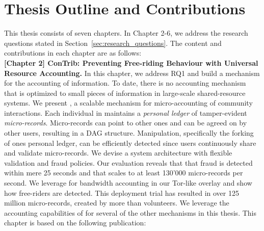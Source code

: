 \section{Thesis Outline and Contributions}
This thesis consists of seven chapters.
In Chapter 2-6, we address the research questions stated in Section~\ref{sec:research_questions}.
The content and contributions in each chapter are as follows:\\

\textbf{[Chapter 2] ConTrib: Preventing Free-riding Behaviour with Universal Resource Accounting.}
In this chapter, we address RQ1 and build a mechanism for the accounting of information.
To date, there is no accounting mechanism that is optimized to small pieces of information in large-scale shared-resource systems.
We present \ModelName{}, a scalable mechanism for micro-accounting of community interactions.
Each individual in \ModelName{} maintains a \emph{personal ledger} of tamper-evident \emph{micro-records}.
Micro-records can point to other ones and can be agreed on by other users, resulting in a DAG structure.
Manipulation, specifically the forking of ones personal ledger, can be efficiently detected since users continuously share and validate micro-records.
We devise a system architecture with flexible validation and fraud policies.
Our evaluation reveals that that fraud is detected within mere 25 seconds and that \ModelName{} scales to at least 130'000 micro-records per second.
We leverage \ModelName{} for bandwidth accounting in our Tor-like overlay and show how free-riders are detected.
This deployment trial has resulted in over 125 million micro-records, created by more than \TrialUsers{} volunteers.
We leverage the accounting capabilities of \ModelName{} for several of the other mechanisms in this thesis.
This chapter is based on the following publication:

\\

